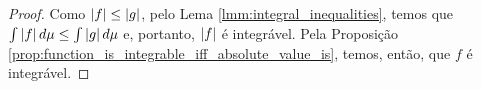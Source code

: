 \begin{proof}
    Como $\left| f \right|\leq \left| g \right|$, pelo Lema \ref{lmm:integral_inequalities}, temos que $\int \left| f \right| d\mu \leq \int \left| g \right| d\mu$ e, portanto, $\left| f \right|$ é integrável. Pela Proposição \ref{prop:function_is_integrable_iff_absolute_value_is}, temos, então, que $f$ é integrável.
\end{proof}